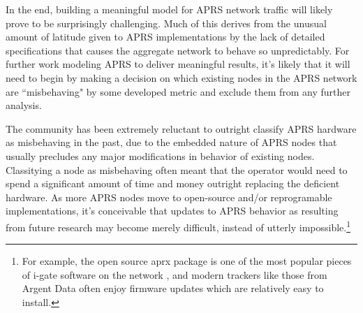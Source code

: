 In the end, building a meaningful model for APRS network traffic will likely prove
to be surprisingly challenging.
Much of this derives from the unusual amount of latitude given to APRS implementations
by the lack of detailed specifications that causes the aggregate network to behave so
unpredictably.
For further work modeling APRS to deliver meaningful results,
it's likely that it will need to begin by making a decision on which existing nodes in the
APRS network are ``misbehaving" by some developed metric and exclude them from
any further analysis.

The community has been extremely reluctant to outright classify APRS hardware
as misbehaving in the past,
due to the embedded nature of APRS nodes that usually precludes any major
modifications in behavior of existing nodes.
Classitying a node as misbehaving often meant that the operator would need to
spend a significant amount of time and money outright replacing the deficient hardware.
As more APRS nodes move to open-source and/or reprogramable implementations,
it's conceivable that updates to APRS behavior as resulting 
from future research may become merely difficult,
instead of utterly impossible.\footnote{For example, the open source aprx package is
	one of the most popular pieces of i-gate software on the network \cite{aprxpopular},
	and modern trackers like those from Argent Data often
enjoy firmware updates which are relatively easy to install.}

